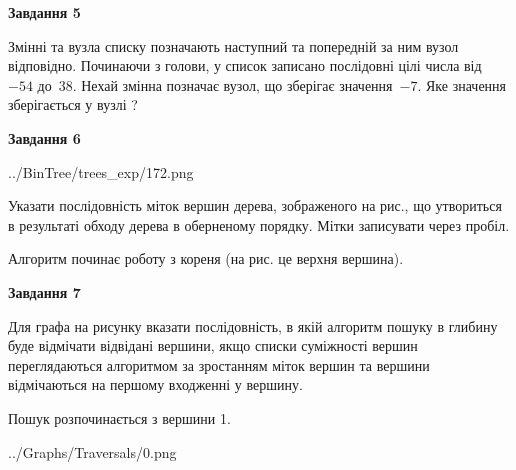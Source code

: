 \documentclass[12pt, ukrainian]{article}
\begin{document}
{\begin {large}
{\begin {center}\textbf{Завдання 5}\end {center}}\par
Змінні  та  вузла списку позначають наступний та попередній за ним вузол відповідно. Починаючи з голови, у список записано послідовні цілі числа від~$-54$ до~$38$. Нехай змінна  позначає вузол, що зберігає значення~$-7$.
Яке значення зберігається у вузлі  ?\par
\newpage

{\begin {center}\textbf{Завдання 6}\end {center}}\par

\begin{center}
	{../BinTree/trees_exp/172.png}
\end{center}
Указати послідовність міток вершин дерева, зображеного на рис., що утвориться в результаті обходу дерева в оберненому порядку. Мітки записувати через пробіл.\par Алгоритм починає роботу з кореня (на рис. це верхня вершина).\par
\newpage

{\begin {center}\textbf{Завдання 7}\end {center}}\par
Для графа на рисунку вказати послідовність, в якій алгоритм пошуку в глибину буде відмічати відвідані вершини, якщо списки суміжності вершин переглядаються алгоритмом за зростанням міток вершин та вершини відмічаються на першому вход\-женні у вершину.\par
Пошук розпочинається з вершини 1.\par

\begin{center}
	{../Graphs/Traversals/0.png}
\end{center}\par
\newpage


\end{large}}
\end{document}

